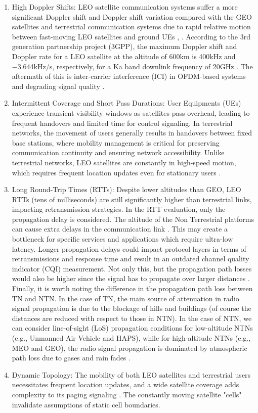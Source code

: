 \documentclass[conference]{IEEEtran}
\begin{document}
\begin{enumerate}
    \item High Doppler Shifts: LEO satellite communication systems suffer a more significant Doppler shift and Doppler shift variation compared with the GEO satellites and terrestrial communication systems due to rapid relative motion between fast-moving LEO satellites and ground UEs \cite{Ref10}, \cite{Ref11}. According to the 3rd generation partnership project (3GPP), the maximum Doppler shift and Doppler rate for a LEO satellite at the altitude of 600km is 400kHz and −3.644kHz/s, respectively, for a Ka band downlink frequency of 20GHz \cite{Ref12}. The aftermath of this is inter-carrier interference (ICI) in OFDM-based systems and degrading signal quality \cite{Ref13}.

    \item Intermittent Coverage and Short Pass Durations: User Equipments (UEs) experience transient visibility windows as satellites pass overhead, leading to frequent handovers and limited time for control signaling. In terrestrial networks, the movement of users generally results in handovers between fixed base stations, where mobility management is critical for preserving communication continuity and ensuring network accessibility. Unlike terrestrial networks, LEO satellites are constantly in high-speed motion, which requires frequent location updates even for stationary users \cite{Ref12a}.

    \item Long Round-Trip Times (RTTs): Despite lower altitudes than GEO, LEO RTTs (tens of milliseconds) are still significantly higher than terrestrial links, impacting retransmission strategies. In the RTT evaluation, only the propagation delay is considered. The altitude of the Non Terrestrial platforms can cause extra delays in the communication link \cite{Ref13a}. This may create a bottleneck for specific services and applications which require ultra-low latency. Longer propagation delays could impact protocol layers in terms of retransmissions and response time and result in an outdated channel quality indicator (CQI) measurement. Not only this, but the propagation path losses would also be higher since the signal has to propagate over larger distances \cite{Refz}. Finally, it is worth noting the difference in the propagation path loss between TN and NTN. In the case of TN, the main source of attenuation in radio signal propagation is due to the blockage of hills and buildings (of course the distances are reduced with respect to those in NTN). In the case of NTN, we can consider line-of-sight (LoS) propagation conditions for low-altitude NTNs (e.g., Unmanned Air Vehicle and HAPS), while for high-altitude NTNs (e.g., MEO and GEO), the radio signal propagation is dominated by atmospheric path loss due to gases and rain fades \cite{Ref14a}.

    \item Dynamic Topology: The mobility of both LEO satellites and terrestrial users necessitates frequent location updates, and a wide satellite coverage adds complexity to its paging signaling \cite{Ref12a}. The constantly moving satellite "cells" invalidate assumptions of static cell boundaries.
\end{enumerate}
\end{document}
